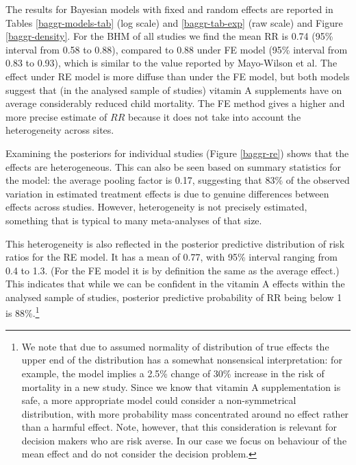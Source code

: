 \documentclass[12pt]{article}
\begin{document}

The results for Bayesian models with fixed and random effects are reported in Tables \ref{baggr-models-tab} (log scale) and \ref{baggr-tab-exp} (raw scale) and Figure \ref{baggr-density}. For the BHM of all studies we find the mean RR is 0.74 (95\% interval from 0.58 to 0.88), compared to 0.88 under FE model (95\% interval from 0.83 to 0.93), which is similar to the value reported by Mayo-Wilson et al.
The effect under RE model is more diffuse than under the FE model, but both models suggest that (in the analysed sample of studies) vitamin A supplements have on average considerably reduced child mortality. The FE method gives a higher and more precise estimate of $RR$ because it does not take into account the heterogeneity across sites. 

Examining the posteriors for individual studies (Figure \ref{baggr-re}) shows that the effects are heterogeneous. This can also be seen based on summary statistics for the model: the average pooling factor is 0.17, suggesting that 83\% of the observed variation in estimated treatment effects is due to genuine differences between effects across studies. However, heterogeneity is not precisely estimated, something that is typical to many meta-analyses of that size. 

This heterogeneity is also reflected in the posterior predictive distribution of risk ratios for the RE model. It has a mean of 0.77, with 95\% interval ranging from 0.4 to 1.3. (For the FE model it is by definition the same as the average effect.) This indicates that while we can be confident in the vitamin A effects within the analysed sample of studies, posterior predictive probability of RR being below 1 is 88\%.\footnote{We note that due to assumed normality of distribution of true effects the upper end of the distribution has a somewhat nonsensical interpretation: for example, the model implies a 2.5\% change of 30\% increase in the risk of mortality in a new study. Since we know that vitamin A supplementation is safe, a more appropriate model could consider a non-symmetrical distribution, with more probability mass concentrated around no effect rather than a harmful effect. Note, however, that this consideration is relevant for decision makers who are risk averse. In our case we focus on behaviour of the mean effect and do not consider the decision problem.}
\end{document}

